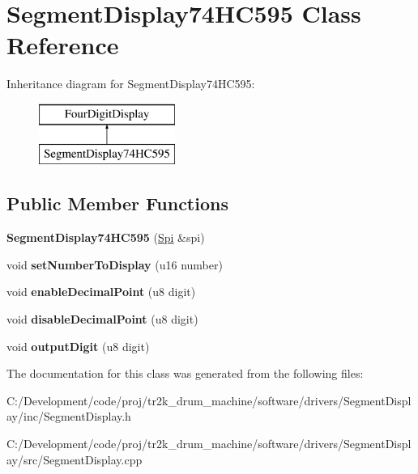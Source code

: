 \hypertarget{class_segment_display74_h_c595}{}\section{Segment\+Display74\+H\+C595 Class Reference}
\label{class_segment_display74_h_c595}
Inheritance diagram for Segment\+Display74\+H\+C595\+:\begin{figure}[H]
\begin{center}
\leavevmode
\includegraphics[height=2.000000cm]{class_segment_display74_h_c595}
\end{center}
\end{figure}
\subsection*{Public Member Functions}
\begin{DoxyCompactItemize}
\item 
\mbox{\label{class_segment_display74_h_c595_ab5a35d882faf010f1f1d5b8f8314a838}} 
{\bfseries Segment\+Display74\+H\+C595} (\mbox{\hyperlink{class_spi}{Spi}} \&spi)
\item 
\mbox{\label{class_segment_display74_h_c595_af3e2629cbe560a66a48e35d7cdb113fb}} 
void {\bfseries set\+Number\+To\+Display} (u16 number)
\item 
\mbox{\label{class_segment_display74_h_c595_a8dc330ae5b1cc9d3b6a942fd4bbf891c}} 
void {\bfseries enable\+Decimal\+Point} (u8 digit)
\item 
\mbox{\label{class_segment_display74_h_c595_a7c0153365c19a9e28e4b8ef43f11fa61}} 
void {\bfseries disable\+Decimal\+Point} (u8 digit)
\item 
\mbox{\label{class_segment_display74_h_c595_a06b400297778098161efbeee609fe8c2}} 
void {\bfseries output\+Digit} (u8 digit)
\end{DoxyCompactItemize}


The documentation for this class was generated from the following files\+:\begin{DoxyCompactItemize}
\item 
C\+:/\+Development/code/proj/tr2k\+\_\+drum\+\_\+machine/software/drivers/\+Segment\+Display/inc/Segment\+Display.\+h\item 
C\+:/\+Development/code/proj/tr2k\+\_\+drum\+\_\+machine/software/drivers/\+Segment\+Display/src/Segment\+Display.\+cpp\end{DoxyCompactItemize}
